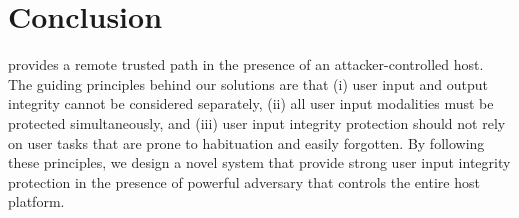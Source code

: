 \section{Conclusion}
\label{sec:conclusion}

\name provides a remote trusted path in the presence of an attacker-controlled host. The guiding principles behind our solutions are that (i) user input and output integrity cannot be considered separately, (ii) all user input modalities must be protected simultaneously, and (iii) user input integrity protection should not rely on user tasks that are prone to habituation and easily forgotten. By following these principles, we design a novel system that provide strong user input integrity protection in the presence of powerful adversary that controls the entire host platform.